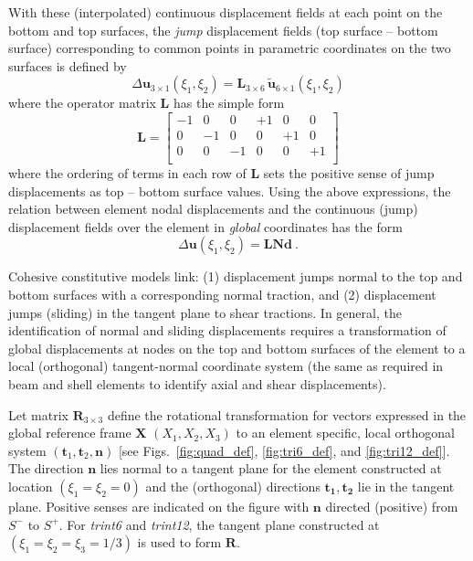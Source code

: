 \documentclass[11pt]{report}
\numberwithin{equation}{section}
\newcommand{\bmf } {\boldsymbol }  %
\newcommand{\ti}{\emph}
\begin{document}
With these (interpolated) continuous displacement fields at each point
on the bottom and top surfaces, the \ti{jump} displacement fields (top surface -- bottom surface)
corresponding to common points in parametric coordinates on the two
surfaces is defined by
%
\begin{equation}
\Delta\bmf{u}_{3 \times 1}(\xi_1, \xi_2) = \bmf{L}_{3 \times 6}
\, \bmf{\tilde u}_{6 \times 1 }(\xi_1, \xi_2)
\end{equation}
%
\noindent where the operator matrix $\bmf{L}$ has the simple form
\begin{equation}
\bmf{L}= \left [
\begin{matrix}
-1 &  0 & 0 & +1 & 0 & 0 \\ 
0 & -1 &  0 & 0 & +1 & 0 \\ 
0 & 0 & -1 & 0 & 0 & +1 \\ 
\end{matrix} \right ]
\end{equation}
where the ordering of terms in each row of $\bmf{L}$  sets the positive 
sense of jump displacements
as top -- bottom surface values.
Using the above expressions, the relation between element nodal 
displacements and the continuous (jump) displacement fields 
over the element in \ti{global} coordinates has the form
%
\begin{equation}
\Delta \bmf{u}(\xi_1, \xi_2) = \bmf{L N d}\ .
\end {equation}
%

Cohesive constitutive models link: (1)
displacement jumps normal
to the top and bottom surfaces with a corresponding normal traction, and 
(2)  displacement jumps (sliding)  in the tangent plane to shear tractions.
In general, the identification of normal and sliding displacements
requires a transformation of global displacements at nodes on the top and bottom
surfaces of the element
to a local (orthogonal) tangent-normal coordinate system (the same as required in beam
and shell elements to identify axial and shear displacements).

Let matrix $\bmf{R}_{3 \times 3}$ define the 
rotational transformation for vectors expressed in the global reference frame  $\bmf{X}$
$(X_1,X_2,X_3)$ to an element specific, local orthogonal system  $(\bmf{t}_1,
\bmf{ t}_2,\bmf{ n})$ 
[see Figs.\ \ref{fig:quad_def},  \ref{fig:tri6_def}, and  \ref{fig:tri12_def}]. 
The direction $\bmf{n}$ lies normal to a tangent plane for the element  constructed at
location $(\xi_1 =\xi_2 = 0)$ and the (orthogonal)
directions $\bmf{t_1}, \bmf{t_2}$ lie in the tangent plane. Positive senses are indicated on the 
figure with $\bmf{n}$ directed (positive) from $S^-$ to $S^+$. 
For \ti{trint6} and \ti{trint12}, the tangent plane constructed at
 $(\xi_1 =\xi_2 = \xi_3 = \textstyle{1/3})$
is used to form $\bmf{R}$. 
\end{document}
